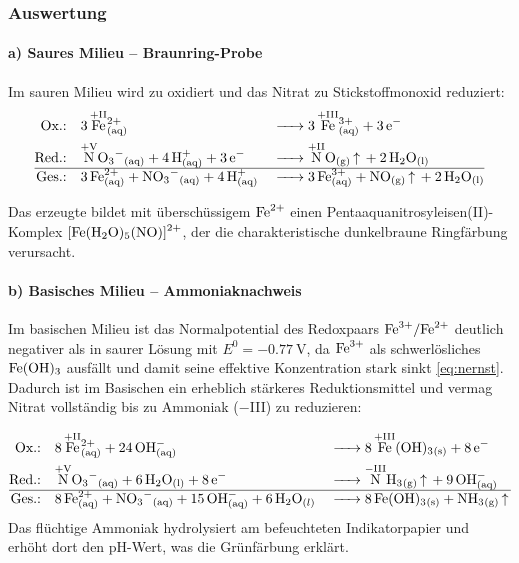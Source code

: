 \subsubsection{Auswertung}

\paragraph{a) Saures Milieu -- Braunring-Probe}
Im sauren Milieu wird  zu  oxidiert und das Nitrat zu Stickstoffmonoxid reduziert:
\begin{align}
    \text{Ox.:}\quad  & \ce{3 \overset{\mathrm{+II}}{\ce{Fe}}^{2+}_{(aq)}}
                      &                                                                      & \ce{-> 3 \overset{\mathrm{+III}}{\ce{Fe}}^{3+}_{(aq)} + 3 e^-} \\
    \text{Red.:}\quad & \ce{\overset{\mathrm{+V}}{\ce{N}}O3^-_{(aq)} + 4 H^+_{(aq)} + 3 e^-}
                      &                                                                      & \ce{-> \overset{\mathrm{+II}}{\ce{N}}O_{(g)} ^ + 2 H2O_{(l)}}  \\
    \hline
    \text{Ges.:}\quad & \ce{3 Fe^{2+}_{(aq)} + NO3^-_{(aq)} + 4 H^+_{(aq)}}
                      &                                                                      & \ce{-> 3 Fe^{3+}_{(aq)} + NO_{(g)} ^ + 2 H2O_{(l)}}
\end{align}

Das erzeugte  bildet mit überschüssigem $\ce{Fe^{2+}}$ einen Pentaaquanitrosyleisen(II)-Komplex $\ce{[Fe(H2O)5(NO)]^{2+}}$, der die charakteristische dunkelbraune Ringfärbung verursacht.\cite{Jander_Blasius_Strähle_Schweda_Rossi_1995}

\paragraph{b) Basisches Milieu -- Ammoniaknachweis}
Im basischen Milieu ist das Normalpotential des Redoxpaars $\ce{Fe^{3+}/Fe^{2+}}$ deutlich negativer als in saurer Lösung mit $E^{0} = \SI{-0.77}{\volt}$, da $\ce{Fe^{3+}}$ als schwerlösliches $\ce{Fe(OH)3}$ ausfällt und damit seine effektive Konzentration stark sinkt \eqref{eq:nernst}.\cite{skript}
Dadurch ist  im Basischen ein erheblich stärkeres Reduktionsmittel und vermag Nitrat vollständig bis zu Ammoniak ($-$III) zu reduzieren:

\begin{align}
    \text{Ox.:}\quad  & \ce{8 \overset{\mathrm{+II}}{\ce{Fe}}^{2+}_{(aq)} + 24 OH^-_{(aq)}}      &  & \ce{-> 8 \overset{\mathrm{+III}}{\ce{Fe}}(OH)3_{(s)} + 8 e^-}     \\
    \text{Red.:}\quad & \ce{\overset{\mathrm{+V}}{\ce{N}}O3^-_{(aq)} + 6 H2O_{(l)} + 8 e^-}      &  & \ce{-> \overset{\mathrm{-III}}{\ce{N}}H3_{(g)} ^ + 9 OH^-_{(aq)}} \\
    \hline
    \text{Ges.:}\quad & \ce{8 Fe^{2+}_{(aq)} + NO3^-_{(aq)} + 15 OH^-_{(aq)}} + \ce{6 H2O}_{(l)} &  & \ce{-> 8 Fe(OH)3_{(s)} + NH3_{(g)} ^}
\end{align}
Das flüchtige Ammoniak hydrolysiert am befeuchteten Indikatorpapier und erhöht dort den pH-Wert, was die Grünfärbung erklärt.\cite{skript}

